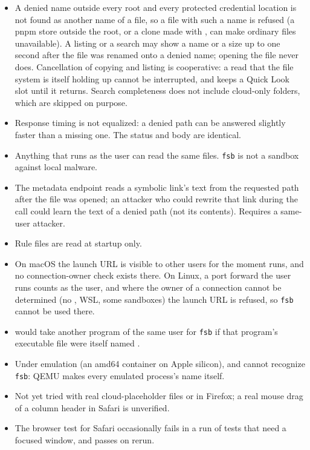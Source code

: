 \begin{itemize}
  \item A denied name outside every root and every protected credential location is not found as another
        name of a file, so a file with such a name is refused (a pnpm store outside the root, or a
        clone made with , can make ordinary files unavailable).  A listing or a
        search may show a name or a size up to one second after the file was renamed onto a denied name;
        opening the file never does.  Cancellation of copying and listing is cooperative: a read that the
        file system is itself holding up cannot be interrupted, and keeps a Quick Look slot until it
        returns.  Search completeness does not include cloud-only folders, which are skipped on purpose.
  \item Response timing is not equalized: a denied path can be answered slightly faster than a missing
        one.  The status and body are identical.
  \item Anything that runs as the user can read the same files.  \texttt{fsb} is not a sandbox against
        local malware.
  \item The metadata endpoint reads a symbolic link's text from the requested path after the file was
        opened; an attacker who could rewrite that link during the call could learn the text of a denied
        path (not its contents).  Requires a same-user attacker.
  \item Rule files are read at startup only.
  \item On macOS the launch URL is visible to other users for the moment  runs, and
        no connection-owner check exists there.  On Linux, a port forward the user runs counts as
        the user, and where the owner of a connection cannot be determined (no , WSL,
        some sandboxes) the launch URL is refused, so \texttt{fsb} cannot be used there.
  \item {} would take another program of the same user for \texttt{fsb} if that
        program's executable file were itself named .
  \item Under emulation (an amd64 container on Apple silicon),  and 
        cannot recognize \texttt{fsb}: QEMU makes every emulated process's 
        name itself.
  \item Not yet tried with real cloud-placeholder files or in Firefox; a real mouse drag of a column
        header in Safari is unverified.
  \item The browser test for Safari occasionally fails in a run of tests that need a focused window,
        and passes on rerun.
\end{itemize}

